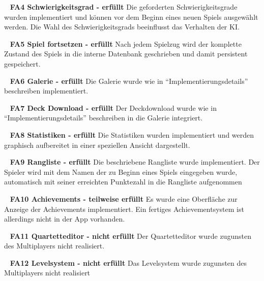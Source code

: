 \documentclass{scrartcl}
\begin{document}
\ \newline
\textbf{FA4 Schwierigkeitsgrad - erfüllt} \newline
Die geforderten Schwierigkeitsgrade wurden implementiert und können vor dem
Beginn eines neuen Spiels ausgewählt werden. Die Wahl des Schwierigkeitsgrads
beeinflusst das Verhalten der KI.

\ \newline
\textbf{FA5 Spiel fortsetzen - erfüllt} \newline
Nach jedem Spielzug wird der komplette Zustand des Spiels in die interne
Datenbank geschrieben und damit persistent gespeichert.

\ \newline
\textbf{FA6 Galerie - erfüllt} \newline
Die Galerie wurde wie in \enquote{Implementierungsdetails} beschreiben
implementiert.

\ \newline
\textbf{FA7 Deck Download - erfüllt} \newline
Der Deckdownload wurde wie in \enquote{Implementierungsdetails} beschreiben in
die Galerie integriert.

\ \newline
\textbf{FA8 Statistiken - erfüllt} \newline
Die Statistiken wurden implementiert und werden graphisch aufbereitet in einer
speziellen Ansicht dargestellt.

\ \newline
\textbf{FA9 Rangliste - erfüllt} \newline
Die beschriebene Rangliste wurde implementiert. Der Spieler wird mit dem Namen
der zu Beginn eines Spiels eingegeben wurde, automatisch mit seiner erreichten
Punktezahl in die Rangliste aufgenommen

\ \newline
\textbf{FA10 Achievements - teilweise erfüllt} \newline
Es wurde eine Oberfläche zur Anzeige der Achievements implementiert. Ein
fertiges Achievementsystem ist allerdings nicht in der App vorhanden.

\ \newline
\textbf{FA11 Quartetteditor - nicht erfüllt} \newline
Der Quartetteditor wurde zugunsten des Multiplayers nicht realisiert.

\ \newline
\textbf{FA12 Levelsystem - nicht erfüllt} \newline
Das Levelsystem wurde zugunsten des Multiplayers nicht realisiert
\end{document}
